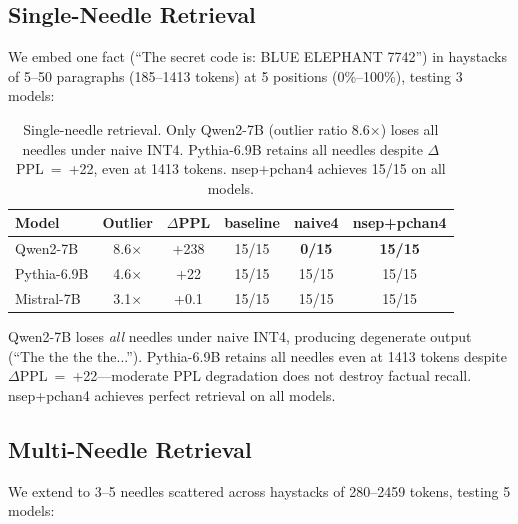 \documentclass[11pt]{article}
\begin{document}
\subsection{Single-Needle Retrieval}

We embed one fact (``The secret code is: BLUE ELEPHANT 7742'') in haystacks of 5--50 paragraphs (185--1413 tokens) at 5 positions (0\%--100\%), testing 3 models:

\begin{table}[h]
\centering
\small
\begin{tabular}{lccccc}
\toprule
Model & Outlier & $\Delta$PPL & baseline & naive4 & nsep+pchan4 \\
\midrule
Qwen2-7B & 8.6$\times$ & +238 & 15/15 & \textbf{0/15} & \textbf{15/15} \\
Pythia-6.9B & 4.6$\times$ & +22 & 15/15 & 15/15 & 15/15 \\
Mistral-7B & 3.1$\times$ & +0.1 & 15/15 & 15/15 & 15/15 \\
\bottomrule
\end{tabular}
\caption{Single-needle retrieval. Only Qwen2-7B (outlier ratio 8.6$\times$) loses all needles under naive INT4. Pythia-6.9B retains all needles despite $\Delta$PPL~=~+22, even at 1413 tokens. nsep+pchan4 achieves 15/15 on all models.}
\label{tab:niah_single}
\end{table}

Qwen2-7B loses \emph{all} needles under naive INT4, producing degenerate output (``The the the the...''). Pythia-6.9B retains all needles even at 1413 tokens despite $\Delta$PPL~=~+22---moderate PPL degradation does not destroy factual recall. nsep+pchan4 achieves perfect retrieval on all models.

\subsection{Multi-Needle Retrieval}

We extend to 3--5 needles scattered across haystacks of 280--2459 tokens, testing 5 models:
\end{document}
